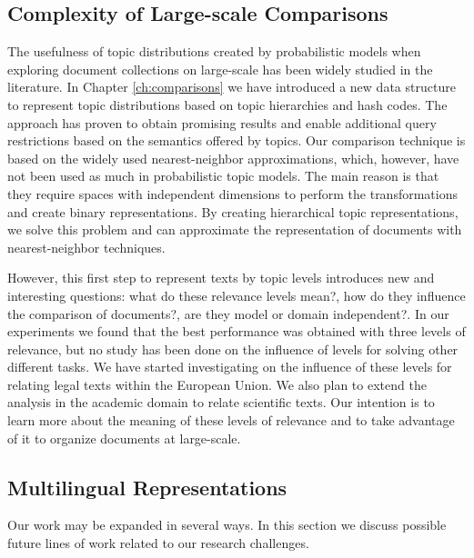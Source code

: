 \subsection{Complexity of Large-scale Comparisons} 

The usefulness of topic distributions created by probabilistic models when exploring document collections on large-scale has been widely studied in the literature. In Chapter \ref{ch:comparisons} we have introduced a new data structure to represent topic distributions based on topic hierarchies and hash codes. The approach has proven to obtain promising results and enable additional query restrictions based on the semantics offered by topics. Our comparison technique is based on the widely used nearest-neighbor approximations, which, however, have not been used as much in probabilistic topic models. The main reason is that they require spaces with independent dimensions to perform the transformations and create binary representations. By creating hierarchical topic representations, we solve this problem and can approximate the representation of documents with nearest-neighbor techniques.

However, this first step to represent texts by topic levels introduces new and interesting questions: what do these relevance levels mean?, how do they influence the comparison of documents?, are they model or domain independent?. In our experiments we found that the best performance was obtained with three levels of relevance, but no study has been done on the influence of levels for solving other different tasks. We have started investigating on the influence of these levels for relating legal texts within the European Union. We also plan to extend the analysis in the academic domain to relate scientific texts. Our intention is to learn more about the meaning of these levels of relevance and to take advantage of it to organize documents at large-scale.



\subsection{Multilingual Representations}















Our work may be expanded in several ways. In this section we discuss possible future lines of work related to our research challenges.

